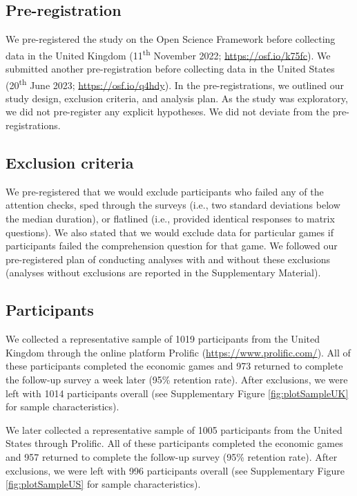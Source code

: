 \documentclass[
  man,floatsintext]{apa6}
\begin{document}
\hypertarget{pre-registration}{%
\subsection{Pre-registration}\label{pre-registration}}

We pre-registered the study on the Open Science Framework before collecting data
in the United Kingdom (11\textsuperscript{th} November 2022; \url{https://osf.io/k75fc}). We submitted
another pre-registration before collecting data in the United States (20\textsuperscript{th}
June 2023; \url{https://osf.io/q4hdy}). In the pre-registrations, we outlined our
study design, exclusion criteria, and analysis plan. As the study was
exploratory, we did not pre-register any explicit hypotheses. We did not deviate
from the pre-registrations.

\hypertarget{exclusion-criteria}{%
\subsection{Exclusion criteria}\label{exclusion-criteria}}

We pre-registered that we would exclude participants who failed any of the
attention checks, sped through the surveys (i.e., two standard deviations below
the median duration), or flatlined (i.e., provided identical responses to matrix
questions). We also stated that we would exclude data for particular games if
participants failed the comprehension question for that game. We followed our
pre-registered plan of conducting analyses with and without these exclusions
(analyses without exclusions are reported in the Supplementary Material).

\hypertarget{participants}{%
\subsection{Participants}\label{participants}}

We collected a representative sample of 1019 participants
from the United Kingdom through the online platform Prolific
(\url{https://www.prolific.com/}). All of these participants completed the economic
games and 973 returned to complete the follow-up survey a
week later (95\% retention
rate). After exclusions, we were left with 1014 participants
overall (see Supplementary Figure \ref{fig:plotSampleUK} for sample
characteristics).

We later collected a representative sample of 1005
participants from the United States through Prolific. All of these participants
completed the economic games and 957 returned to complete
the follow-up survey (95\%
retention rate). After exclusions, we were left with 996
participants overall (see Supplementary Figure \ref{fig:plotSampleUS} for
sample characteristics).
\end{document}
